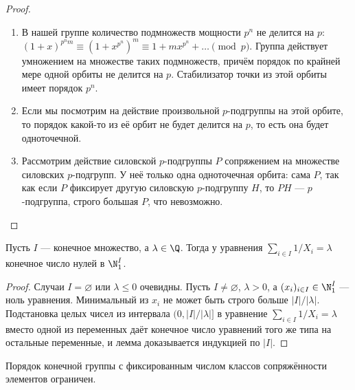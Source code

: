 \documentclass[
	extrafontsizes,
	11pt,
	hyphens,
]{memoir}
\begin{document}
\begin{proof}
~\begin{enumerate}[
	font=\upshape,
	label=\asbuk*),
	ref=\asbuk*,
	]

\item В нашей группе количество подмножеств мощности \(p^n\) не делится на \(p\):
\((1+x)^{p^n m} \equiv (1+x^{p^n})^m \equiv 1+mx^{p^n}+\dots{} \pmod p\).
Группа действует умножением на множестве таких подмножеств, причём порядок по крайней мере одной орбиты не делится на \(p\). Стабилизатор точки из этой орбиты имеет порядок \(p^n\).

\item Если мы посмотрим на действие произвольной \(p\)-под\-груп\-пы на этой орбите, то порядок какой-то из её орбит не будет делится на \(p\), то есть она будет одноточечной.

\item Рассмотрим действие силовской \(p\)-подгруппы \(P\) сопряжением на множестве силовских \(p\)-подгрупп. У неё только одна одноточечная орбита: сама \(P\), так как если \(P\) фиксирует другую силовскую \(p\)-подгруппу \(H\), то \(PH\) --- \(p\)-под\-груп\-па, строго большая \(P\), что невозможно.
\qedhere

\end{enumerate}
\end{proof}

\begin{lemma}
\label{lem:grp_land}
Пусть \(I\) --- конечное множество, а \(\lambda \in \Q\).
Тогда у уравнения \(\sum_{i \in I} 1/X_i = \lambda\) конечное число нулей в \(\N_1^I\).
\end{lemma}

\begin{proof}
Случаи \(I = \varnothing\) или \(\lambda \leq 0\) очевидны.
Пусть \(I \neq \varnothing\), \(\lambda > 0\), а \((x_i)_{i \in I} \in \N_1^I\) --- ноль уравнения.
Минимальный из \(x_i\) не может быть строго больше \(\lvert I \rvert / \lvert \lambda \rvert\).
Подстановка целых чисел из интервала \((0, \lvert I \rvert / \lvert \lambda \rvert]\) в уравнение \(\sum_{i \in I} 1/X_i = \lambda\) вместо одной из переменных даёт конечное число уравнений того же типа на остальные переменные, и лемма доказывается индукцией по \(\lvert I \rvert\).
\end{proof}

\begin{theorem}
Порядок конечной группы с фиксированным числом классов сопряжённости элементов ограничен.
\end{theorem}
\end{document}

